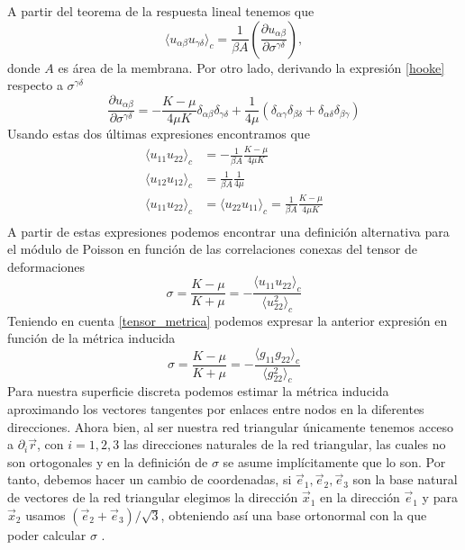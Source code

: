 A partir del teorema de la respuesta lineal \cite{Binney:critical_phenomema}
tenemos que
\begin{equation}
\langle u_{\alpha\beta}u_{\gamma\delta} \rangle_c
=\frac{1}{\beta A}\left(\frac{\partial u_{\alpha\beta}}{\partial \sigma^{\gamma\delta}}\right),
\end{equation}
donde $A$ es área de la membrana. Por otro lado, derivando la expresión
\eqref{hooke} respecto a $\sigma^{\gamma\delta}$
\begin{equation}\frac{\partial u_{\alpha\beta}}{\partial
  \sigma^{\gamma\delta}}=-\frac{K-\mu}{4\mu K}\delta_{\alpha\beta}\delta_{\gamma\delta}+\frac{1}{4\mu}(\delta_{\alpha\gamma}\delta_{\beta\delta}+\delta_{\alpha\delta}\delta_{\beta\gamma})
\end{equation}
Usando estas dos últimas expresiones encontramos que 
\begin{align}
\langle u_{11}u_{22} \rangle_c&=-\frac{1}{\beta A}\frac{K-\mu}{4\mu K}\\
\langle u_{12}u_{12} \rangle_c&=\frac{1}{\beta A}\frac{1}{4\mu}\\
\langle u_{11}u_{22} \rangle_c&=\langle u_{22}u_{11} \rangle_c=\frac{1}{\beta
  A}\frac{K-\mu}{4\mu K}\\
\end{align}
A partir de estas expresiones podemos encontrar una definición alternativa
para el módulo de Poisson \cite{Zang_Dmolecular,Parrinello_Crystal} en
función de las correlaciones conexas del tensor 
de deformaciones
\begin{equation}
\sigma=\frac{K-\mu}{K+\mu}=-\frac{\langle u_{11}u_{22}
  \rangle_c}{\langle u_{22}^2 \rangle_c}
\end{equation}
Teniendo en cuenta \eqref{tensor_metrica} podemos expresar la anterior
expresión en función de la métrica inducida 
\begin{equation}
\sigma=\frac{K-\mu}{K+\mu}=-\frac{\langle g_{11}g_{22}
  \rangle_c}{\langle g_{22}^2 \rangle_c}
\end{equation}
Para nuestra superficie discreta podemos estimar la métrica inducida
aproximando los vectores tangentes por enlaces entre nodos en la diferentes
direcciones. Ahora bien, al ser nuestra red triangular únicamente tenemos acceso a
$\partial_i \vec{r}$, con $i=1,2,3$ las direcciones naturales de la red
triangular, las cuales no son ortogonales y en la definición de $\sigma$ se
asume implícitamente que lo son. Por tanto, debemos hacer un cambio de coordenadas, si
$\vec{e}_1,\vec{e}_2,\vec{e}_3$ son la base natural de vectores de la red
triangular elegimos la dirección $\vec{x}_1$ en la dirección $\vec{e}_1$ y
para $\vec{x}_2$ usamos $(\vec{e}_2+\vec{e}_3)/\sqrt{3}$, obteniendo así una
base ortonormal con la que poder calcular $\sigma$ \cite{Bowick_poisson_ratio}.


